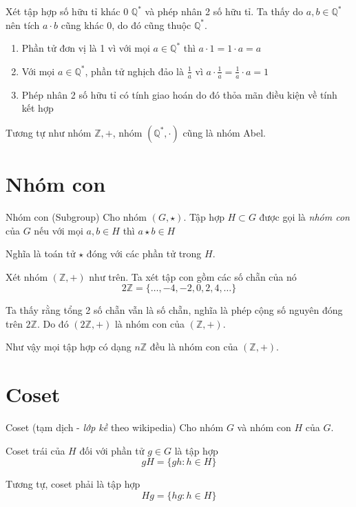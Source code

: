 \begin{example}
    Xét tập hợp số hữu tỉ khác 0 $\mathbb{Q}^*$ và phép nhân 2 số hữu tỉ. Ta thấy do $a, b \in \mathbb{Q}^*$ nên tích $a \cdot b$ cũng khác 0, do đó cũng thuộc $\mathbb{Q}^*$.
    \begin{enumerate}[noitemsep]
        \item Phần tử đơn vị là 1 vì với mọi $a \in \mathbb{Q}^*$ thì $a \cdot 1 = 1 \cdot a = a$
        \item Với mọi $a \in \mathbb{Q}^*$, phần tử nghịch đảo là $\frac{1}{a}$ vì $a \cdot \frac{1}{a} = \frac{1}{a} \cdot a = 1$
        \item Phép nhân 2 số hữu tỉ có tính giao hoán do đó thỏa mãn điều kiện về tính kết hợp
    \end{enumerate}
    Tương tự như nhóm $\mathbb{Z, +}$, nhóm $(\mathbb{Q}^*, \cdot)$ cũng là nhóm Abel.
\end{example}

\section{Nhóm con}

\begin{definition}{Nhóm con (Subgroup)}
    Cho nhóm $(G, \star)$. Tập hợp $H \subset G$ được gọi là \textit{nhóm con} của $G$ nếu với mọi $a, b \in H$ thì $a \star b \in H$
\end{definition}
 
Nghĩa là toán tử $\star$ đóng với các phần tử trong $H$.

\begin{example}
    Xét nhóm $(\mathbb{Z}, +)$ như trên. Ta xét tập con gồm các số chẵn của nó
    \[2\mathbb{Z} = \{\ldots, -4, -2, 0, 2, 4, \ldots\}\]

    Ta thấy rằng tổng 2 số chẵn vẫn là số chẵn, nghĩa là phép cộng số nguyên đóng trên $2\mathbb{Z}$.
    Do đó $(2\mathbb{Z}, +)$ là nhóm con của $(\mathbb{Z}, +)$.

    Như vậy mọi tập hợp có dạng $n \mathbb{Z}$ đều là nhóm con của $(\mathbb{Z}, +)$.
\end{example}

\section{Coset}

\begin{definition}{Coset}
    (tạm dịch - \textit{lớp kề} theo wikipedia) Cho nhóm $G$ và nhóm con $H$ của $G$.

    Coset trái của $H$ đối với phần tử $g \in G$ là tập hợp
    \[gH = \{gh : h \in H \}\]

    Tương tự, coset phải là tập hợp
    \[Hg = \{hg : h \in H \}\]
\end{definition}

